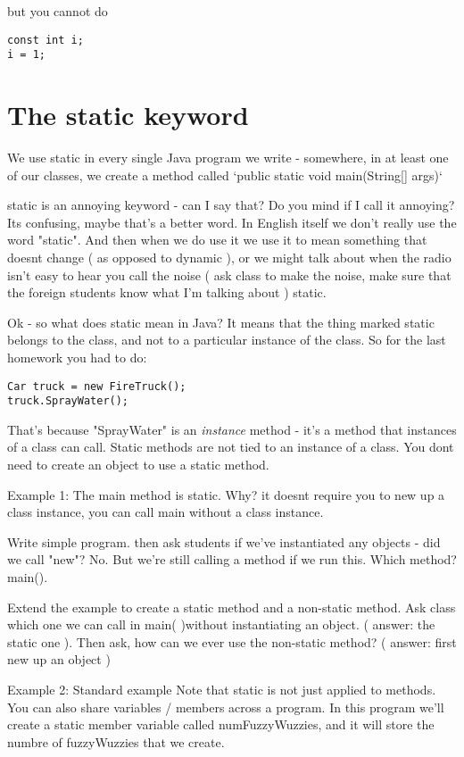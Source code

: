 \documentclass[12pt]{article}
\begin{document}
but you cannot do

\begin{lstlisting}
const int i;
i = 1;
\end{lstlisting}

\section{The static keyword}
We use static in every single Java program we write - somewhere, in at least one
of our classes, we create a method called `public static void main(String[] args)`

static is an annoying keyword - can I say that? Do you mind if I call it
annoying? Its confusing, maybe that's a better word. In English itself we don't
really use the word "static". And then when we do use it we use it to mean
something that doesnt change ( as opposed to dynamic ), or we might talk about
when the radio isn't easy to hear you call the noise ( ask class to make the
noise, make sure that the foreign students know what I'm talking about ) static.

Ok - so what does static mean in Java? It means that the thing marked static
belongs to the class, and not to a particular instance of the class. So for the
last homework you had to do:

\begin{lstlisting}
Car truck = new FireTruck();
truck.SprayWater();
\end{lstlisting}

That's because "SprayWater" is an \textit{instance} method - it's a method that
instances of a class can call. Static methods are not tied to an instance of a
class. You dont need to create an object to use a static method.

Example 1: The main method is static. Why? it doesnt require you to new up a
class instance, you can call main without a class instance.

Write simple program. then ask students if we've instantiated any objects - did
we call "new"? No. But we're still calling a method if we run this. Which
method? main(). 

Extend the example to create a static method and a non-static method. Ask class
which one we can call in main( )without instantiating an object. ( answer: the
static one ). Then ask, how can we ever use the non-static method? ( answer:
first new up an object )

Example 2: Standard example
Note that static is not just applied to methods. You can also share variables /
members across a program. In this program we'll create a static member variable
called numFuzzyWuzzies, and it will store the numbre of fuzzyWuzzies that we
create.
\end{document}

